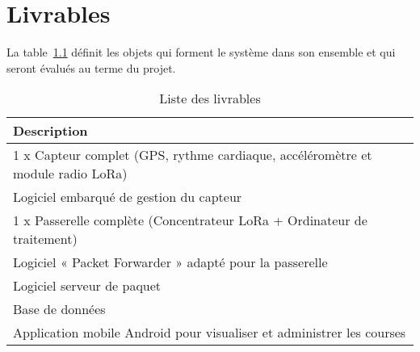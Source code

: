 \clearpage
\pagestyle{fancy}
\chapter{Livrables}

La table~\ref{tab:livrables} définit les objets qui forment le système dans son ensemble et qui seront évalués au terme du projet. 

\begin{table}[htb]
\caption[Liste des livrables]{Liste des livrables}
\label{tab:livrables}
\centering
\begin{tabular}{l}
\toprule
Description \\
\midrule
1 x Capteur complet (GPS, rythme cardiaque, accéléromètre et module radio LoRa)  \\
Logiciel embarqué de gestion du capteur \\
1 x Passerelle complète (Concentrateur LoRa + Ordinateur de traitement) \\
Logiciel « Packet Forwarder » adapté pour la passerelle \\
Logiciel serveur de paquet \\
Base de données \\
Application mobile Android pour visualiser et administrer les courses \\
\bottomrule 
\end{tabular}
\end{table}